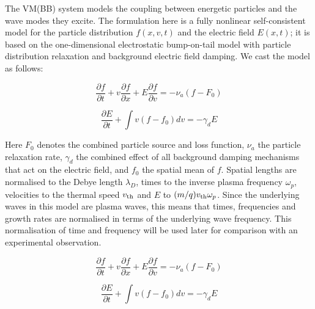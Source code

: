 \documentclass{article}
\begin{document}
The VM(BB) system models the coupling between energetic particles and the wave modes they excite.
The formulation here is a fully nonlinear self-consistent model for the particle distribution $f(x,v,t)$ and the electric field $E(x,t)$; it is based on the one-dimensional electrostatic bump-on-tail model with particle distribution relaxation and background electric field damping. We cast the model as follows:

\begin{equation}
\label{MVE}
	\frac{\partial f}{\partial t} + v \frac{\partial f}{\partial x} + E \frac{\partial f}{\partial v} =
		- \nu_a \left( f - F_0 \right)
\end{equation}

\begin{equation}
\label{MDCE}
	\frac{\partial E}{\partial t} + \int v \left( f - f_0 \right) dv = - \gamma_d E
\end{equation}

Here $F_0$ denotes the combined particle source and loss function, $\nu_a$ the particle relaxation rate, $\gamma_d$ the combined effect of all background damping mechanisms that act on the electric field, and $f_0$ the spatial mean of $f$.
Spatial lengths are normalised to the Debye length $\lambda_D$, times to the inverse plasma frequency $\omega_p$, velocities to the thermal speed $v_{\rm th}$ and $E$ to $(m/q) v_{\rm th} \omega_p$. Since the underlying waves in this model are plasma waves, this means that times, frequencies and growth rates are normalised in terms of the underlying wave frequency. This normalisation of time and frequency will be used later for comparison with an experimental observation.

\[
\label{MVE}
	\frac{\partial f}{\partial t} + v \frac{\partial f}{\partial x} + E \frac{\partial f}{\partial v} =
		- \nu_a \left( f - F_0 \right)
\]

\[
\label{MDCE}
	\frac{\partial E}{\partial t} + \int v \left( f - f_0 \right) dv = - \gamma_d E
\]
\end{document}
